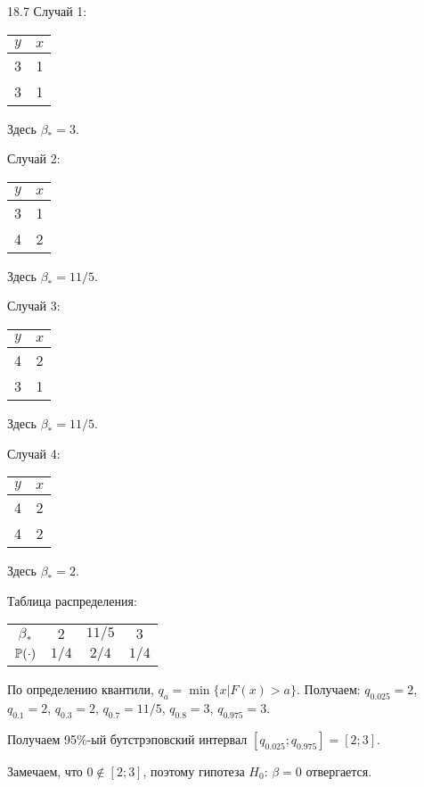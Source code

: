 \begin{solution}{{18.7}}
Случай 1:

\begin{tabular}{cc}
\toprule
$y$ & $x$ \\
\midrule
 3 & 1 \\
 3 & 1 \\
\bottomrule
\end{tabular}

Здесь $\beta_* = 3$.

Случай 2:

\begin{tabular}{cc}
\toprule
$y$ & $x$ \\
\midrule
 3 & 1 \\
 4 & 2 \\
\bottomrule
\end{tabular}

Здесь $\beta_* = 11/5$.

Случай 3:

\begin{tabular}{cc}
\toprule
$y$ & $x$ \\
\midrule
 4 & 2 \\
 3 & 1 \\
\bottomrule
\end{tabular}

Здесь $\beta_* = 11/5$.

Случай 4:

\begin{tabular}{cc}
\toprule
$y$ & $x$ \\
\midrule
 4 & 2 \\
 4 & 2 \\
\bottomrule
\end{tabular}

Здесь $\beta_* = 2$.

Таблица распределения:

\begin{tabular}{c|ccc}
\toprule
$\beta_*$ & $2$ & $11/5$ & $3$ \\
$\P(\cdot)$ & $1/4$ & $2/4$ & $1/4$ \\
\bottomrule
\end{tabular}

По определению квантили, $q_a = \min \{x | F(x) > a \}$. Получаем: $q_{0.025} = 2$, $q_{0.1} = 2$, $q_{0.3} = 2$, $q_{0.7} = 11/5$, $q_{0.8} = 3$, $q_{0.975} = 3$.


Получаем 95\%-ый бутстрэповский интервал $[q_{0.025}; q_{0.975}]=[2;3]$.


Замечаем, что $0 \notin [2;3]$, поэтому гипотеза $H_0$: $\beta = 0$ отвергается.

\end{solution}
